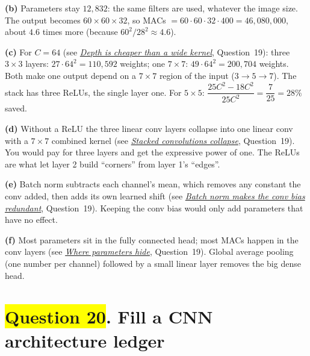 \documentclass[12pt,a4paper]{article}
\newcommand{\seeconcept}[3]{(see \hyperref[#1]{\textit{#2}}, Question~#3)}
\newcommand{\hlq}[1]{{\setlength{\fboxsep}{1.5pt}\colorbox{yellow}{#1}}}
\begin{document}
\textbf{(b)} Parameters stay $12{,}832$: the same filters are used, whatever the image size. The output becomes $60\times60\times32$, so MACs $=60\cdot60\cdot32\cdot400=46{,}080{,}000$, about $4.6$ times more (because $60^2/28^2\approx4.6$).

\textbf{(c)} For $C=64$ \seeconcept{c:depth}{Depth is cheaper than a wide kernel}{19}: three $3\times3$ layers: $27\cdot64^2=110{,}592$ weights; one $7\times7$: $49\cdot64^2=200{,}704$ weights. Both make one output depend on a $7\times7$ region of the input ($3\to5\to7$). The stack has three ReLUs, the single layer one. For $5\times5$: $\dfrac{25C^2-18C^2}{25C^2}=\dfrac{7}{25}=28\%$ saved.

\textbf{(d)} Without a ReLU the three linear conv layers collapse into one linear conv with a $7\times7$ combined kernel \seeconcept{c:convassoc}{Stacked convolutions collapse}{19}. You would pay for three layers and get the expressive power of one. The ReLUs are what let layer 2 build ``corners'' from layer 1's ``edges''.

\textbf{(e)} Batch norm subtracts each channel's mean, which removes any constant the conv added, then adds its own learned shift \seeconcept{c:bn}{Batch norm makes the conv bias redundant}{19}. Keeping the conv bias would only add parameters that have no effect.

\textbf{(f)} Most parameters sit in the fully connected head; most MACs happen in the conv layers \seeconcept{c:gap}{Where parameters hide}{19}. Global average pooling (one number per channel) followed by a small linear layer removes the big dense head.

\section[Question 20. Fill a CNN architecture ledger]{\hlq{Question 20}. Fill a CNN architecture ledger}
\end{document}
